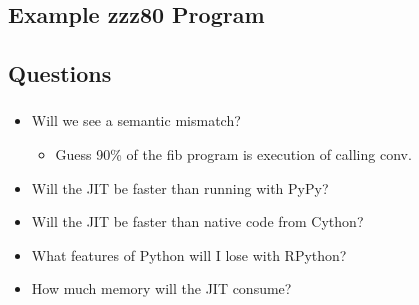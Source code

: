\documentclass[compress]{beamer}
\begin{document}
\subsection{Example zzz80 Program}
\begin{frame}[fragile]
	\frametitle{\insertsubsection}
	
\end{frame}

\subsection{Questions}
\begin{frame}[fragile]
	\frametitle{\insertsubsection}

	\begin{itemize}
		\item Will we see a semantic mismatch?
			\begin{itemize}
			\item Guess 90\% of the fib program is execution of calling conv.
			\end{itemize}
			\vfill
		\item Will the JIT be faster than running with PyPy?
			\vfill
		\item Will the JIT be faster than native code from Cython?
			\vfill
		\item What features of Python will I lose with RPython?
			\vfill
		\item How much memory will the JIT consume?
	\end{itemize}
\end{frame}
\end{document}
